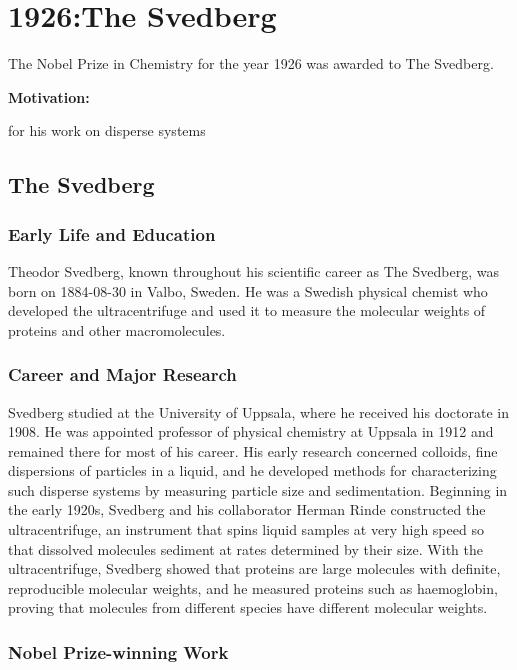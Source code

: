 \chapter{1926:The Svedberg}

\label{chap:chemistry1926}

The Nobel Prize in Chemistry for the year 1926 was awarded to The Svedberg.

\textbf{Motivation:}

for his work on disperse systems

\section{The Svedberg}

\subsection*{Early Life and Education}

Theodor Svedberg, known throughout his scientific career as The Svedberg, was born on 1884-08-30 in Valbo, Sweden.
He was a Swedish physical chemist who developed the ultracentrifuge and used it to measure the molecular weights of proteins and other macromolecules.

\subsection*{Career and Major Research}

Svedberg studied at the University of Uppsala, where he received his doctorate in 1908.
He was appointed professor of physical chemistry at Uppsala in 1912 and remained there for most of his career.
His early research concerned colloids, fine dispersions of particles in a liquid, and he developed methods for characterizing such disperse systems by measuring particle size and sedimentation.
Beginning in the early 1920s, Svedberg and his collaborator Herman Rinde constructed the ultracentrifuge, an instrument that spins liquid samples at very high speed so that dissolved molecules sediment at rates determined by their size.
With the ultracentrifuge, Svedberg showed that proteins are large molecules with definite, reproducible molecular weights, and he measured proteins such as haemoglobin, proving that molecules from different species have different molecular weights.

\subsection*{Nobel Prize-winning Work}


